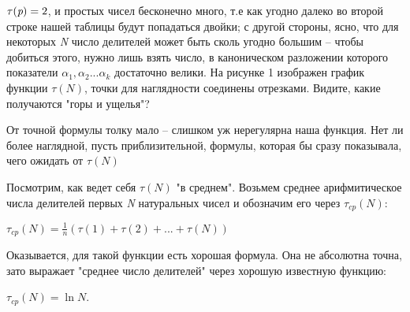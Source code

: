 \documentclass{article}
\begin{document}
\begin{math}
    \tau(\emph{p}) = 2
\end{math}, и простых чисел бесконечно много, т.е как угодно далеко во второй строке нашей таблицы будут попадаться двойки; с другой стороны, ясно, что для некоторых \emph{N} число делителей может быть сколь угодно большим -- чтобы добиться этого, нужно лишь взять число, в каноническом разложении которого показатели 
\begin{math}
\alpha_1, \alpha_2 ... \alpha_k
\end{math} достаточно велики.
На рисунке 1 изображен график функции \begin{math}
    \tau(N)
\end{math}, точки для наглядности соединены отрезками. Видите, какие получаются "горы и ущелья"?

От точной формулы толку мало -- слишком уж нерегулярна наша функция. Нет ли более наглядной, пусть приблизительной, формулы, которая бы сразу показывала, чего ожидать от \begin{math}
    \tau(N)
\end{math}

Посмотрим, как ведет себя \begin{math}
    \tau(N)
\end{math} "в среднем". Возьмем среднее арифмитическое числа делителей первых \emph{N} натуральных чисел и обозначим его через \begin{math}
    \tau_{cp}(N):
\end{math} 

\begin{math}
     \tau_{cp}(N) = \frac{1}{n}(\tau(1) + \tau(2) + ... + \tau(N))
\end{math}

Оказывается, для такой функции есть хорошая формула. Она не абсолютна точна, зато выражает "среднее число делителей" через хорошую известную функцию:

\begin{math}
    \tau_{cp}(N) = \ln N
\end{math}.
\end{document}
